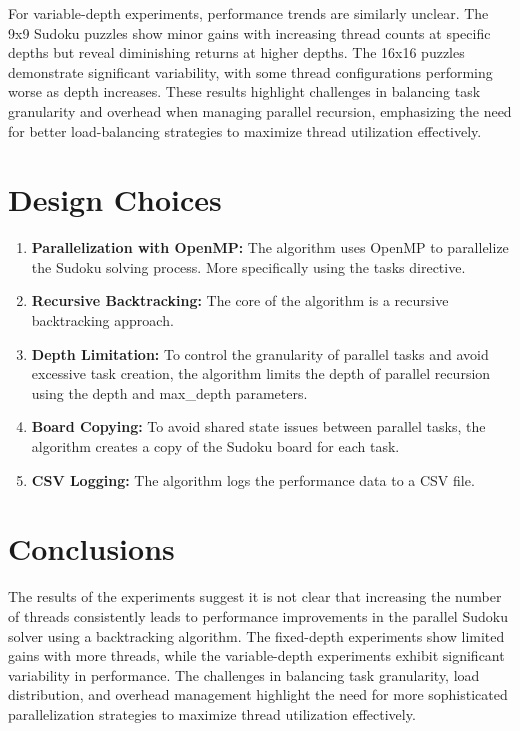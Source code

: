 \documentclass[a4paper,11pt]{article}
\begin{document}
For variable-depth experiments, performance trends are similarly unclear. The 9x9 Sudoku puzzles show minor gains with increasing thread counts at specific depths but reveal diminishing returns at higher depths. The 16x16 puzzles demonstrate significant variability, with some thread configurations performing worse as depth increases. These results highlight challenges in balancing task granularity and overhead when managing parallel recursion, emphasizing the need for better load-balancing strategies to maximize thread utilization effectively.

\section{Design Choices}

\begin{enumerate}
    \item \textbf{Parallelization with OpenMP:} The algorithm uses OpenMP to parallelize the Sudoku solving process. More specifically using the tasks directive.
    \item \textbf{Recursive Backtracking:} The core of the algorithm is a recursive backtracking approach.
    \item \textbf{Depth Limitation:} To control the granularity of parallel tasks and avoid excessive task creation, the algorithm limits the depth of parallel recursion using the depth and max\_depth parameters.
    \item \textbf{Board Copying:} To avoid shared state issues between parallel tasks, the algorithm creates a copy of the Sudoku board for each task.
    \item \textbf{CSV Logging:} The algorithm logs the performance data to a CSV file.
\end{enumerate}

\section{Conclusions}

The results of the experiments suggest it is not clear that increasing the number of threads consistently leads to performance improvements in the parallel Sudoku solver using a backtracking algorithm. The fixed-depth experiments show limited gains with more threads, while the variable-depth experiments exhibit significant variability in performance. The challenges in balancing task granularity, load distribution, and overhead management highlight the need for more sophisticated parallelization strategies to maximize thread utilization effectively. 
\end{document}

